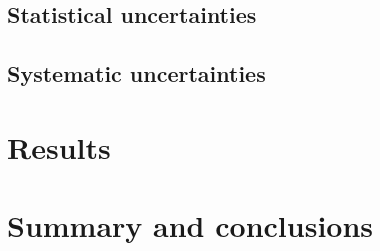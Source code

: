 \subsection{Statistical uncertainties}


\subsection{Systematic uncertainties}




\section{Results}

\section{Summary and conclusions}

